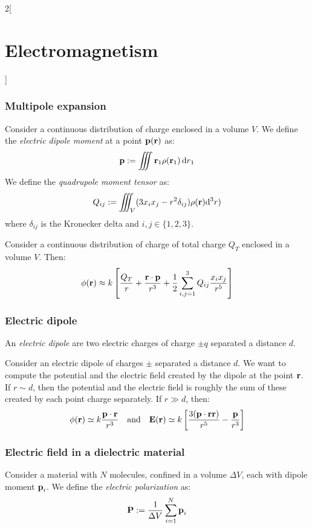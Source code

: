 \documentclass[../../../main.tex]{subfiles}
\begin{document}
\begin{multicols}{2}[\section{Electromagnetism}]
  \subsubsection{Multipole expansion}
  \begin{definition}
    Consider a continuous distribution of charge enclosed in a volume $V$. We define the \emph{electric dipole moment} at a point $\boldsymbol{\mathrm{p}}(\boldsymbol{\mathrm{r}})$ as: $$\boldsymbol{\mathrm{p}}:=\iiint\boldsymbol{\mathrm{r}}_1\rho(\boldsymbol{\mathrm{r}}_1)\dd{r}_1$$
    We define the \emph{quadrupole moment tensor} as: $$Q_{ij}:=\iiint_V(3x_ix_j-r^2\delta_{ij})\rho(\boldsymbol{\mathrm{r}})\dd^3 r)$$ where $\delta_{ij}$ is the Kronecker delta and $i,j\in\{1,2,3\}$.
  \end{definition}
  \begin{proposition}
    Consider a continuous distribution of charge of total charge $Q_T$ enclosed in a volume $V$. Then:
    $$\phi(\boldsymbol{\mathrm{r}})\approx k\left[\frac{Q_T}{r}+\frac{\boldsymbol{\mathrm{r}}\cdot\boldsymbol{\mathrm{p}}}{r^3}+\frac{1}{2}\sum_{i,j=1}^3Q_{ij}\frac{x_ix_j}{r^5}\right]$$
  \end{proposition}
  \subsubsection{Electric dipole}
  \begin{definition}
    An \emph{electric dipole} are two electric charges of charge $\pm q$ separated a distance $d$.
  \end{definition}
  \begin{proposition}
    Consider an electric dipole of charges $\pm$ separated a distance $d$. We want to compute the potential and the electric field created by the dipole at the point $\boldsymbol{\mathrm{r}}$. If $r\sim d$, then the potential and the electric field is roughly the sum of these created by each point charge separately. If $r\gg d$, then:
    $$\phi(\boldsymbol{\mathrm{r}})\simeq k\frac{\boldsymbol{\mathrm{p}}\cdot \boldsymbol{\mathrm{r}}}{r^3}\quad\text{and}\quad \boldsymbol{\mathrm{E}}(\boldsymbol{\mathrm{r}})\simeq k\left[\frac{3(\boldsymbol{\mathrm{p}}\cdot \boldsymbol{\mathrm{r}}\boldsymbol{\mathrm{r}})}{r^5}-\frac{\boldsymbol{\mathrm{p}}}{r^3}\right]$$
  \end{proposition}
  \subsubsection{Electric field in a dielectric material}
  \begin{definition}
    Consider a material with $N$ molecules, confined in a volume $\Delta V$, each with dipole moment $\boldsymbol{\mathrm{p}}_i$. We define the \emph{electric polarization} as: $$\boldsymbol{\mathrm{P}}:=\frac{1}{\Delta V}\sum_{i=1}^N\boldsymbol{\mathrm{p}}_i$$
  \end{definition}
\end{multicols}
\end{document}
